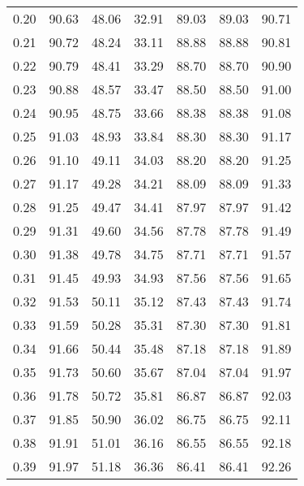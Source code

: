 \begin{tabular}{|c|c|c|c|c|c|c|}
      0.20 &     90.63 &     48.06 &      32.91 &   89.03 &      89.03 &         90.71 \\
      0.21 &     90.72 &     48.24 &      33.11 &   88.88 &      88.88 &         90.81 \\
      0.22 &     90.79 &     48.41 &      33.29 &   88.70 &      88.70 &         90.90 \\
      0.23 &     90.88 &     48.57 &      33.47 &   88.50 &      88.50 &         91.00 \\
      0.24 &     90.95 &     48.75 &      33.66 &   88.38 &      88.38 &         91.08 \\
      0.25 &     91.03 &     48.93 &      33.84 &   88.30 &      88.30 &         91.17 \\
      0.26 &     91.10 &     49.11 &      34.03 &   88.20 &      88.20 &         91.25 \\
      0.27 &     91.17 &     49.28 &      34.21 &   88.09 &      88.09 &         91.33 \\
      0.28 &     91.25 &     49.47 &      34.41 &   87.97 &      87.97 &         91.42 \\
      0.29 &     91.31 &     49.60 &      34.56 &   87.78 &      87.78 &         91.49 \\
      0.30 &     91.38 &     49.78 &      34.75 &   87.71 &      87.71 &         91.57 \\
      0.31 &     91.45 &     49.93 &      34.93 &   87.56 &      87.56 &         91.65 \\
      0.32 &     91.53 &     50.11 &      35.12 &   87.43 &      87.43 &         91.74 \\
      0.33 &     91.59 &     50.28 &      35.31 &   87.30 &      87.30 &         91.81 \\
      0.34 &     91.66 &     50.44 &      35.48 &   87.18 &      87.18 &         91.89 \\
      0.35 &     91.73 &     50.60 &      35.67 &   87.04 &      87.04 &         91.97 \\
      0.36 &     91.78 &     50.72 &      35.81 &   86.87 &      86.87 &         92.03 \\
      0.37 &     91.85 &     50.90 &      36.02 &   86.75 &      86.75 &         92.11 \\
      0.38 &     91.91 &     51.01 &      36.16 &   86.55 &      86.55 &         92.18 \\
      0.39 &     91.97 &     51.18 &      36.36 &   86.41 &      86.41 &         92.26 \\

\end{tabular}

